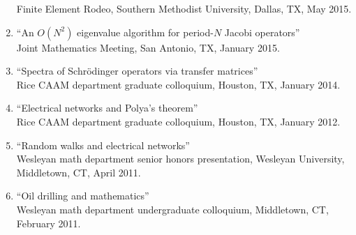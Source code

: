 \documentclass{article} %
\begin{document}
\begin{enumerate}
Finite Element Rodeo, Southern Methodist University, Dallas, TX, May 2015.
\item ``An $O(N^2)$ eigenvalue algorithm for period-$N$ Jacobi operators'' \\
Joint Mathematics Meeting, San Antonio, TX, January 2015. 
\item ``Spectra of Schr\"odinger operators via transfer matrices'' \\
Rice CAAM department graduate colloquium, Houston, TX, January 2014.
\item ``Electrical networks and Polya's theorem'' \\
Rice CAAM department graduate colloquium, Houston, TX, January 2012.
\item ``Random walks and electrical networks'' \\
Wesleyan math department senior honors presentation, Wesleyan University, Middletown, CT, April 2011.
\item ``Oil drilling and mathematics'' \\ 
Wesleyan math department undergraduate colloquium, Middletown, CT, February 2011.
\end{enumerate}
\end{document}
